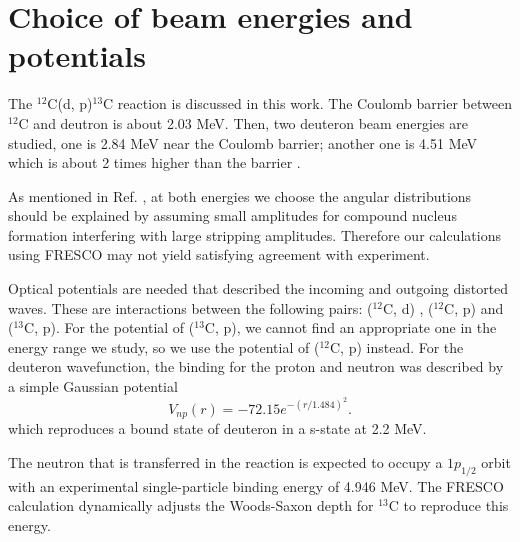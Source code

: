 \section{Choice of beam energies and potentials} \label{part1}
	The $^{12}$C(d, p)$^{13}$C reaction is discussed in this work. 
	The Coulomb barrier between $^{12}$C and deutron is about 2.03 MeV.
	Then, two deuteron beam energies are studied, one is 2.84 MeV near the Coulomb barrier; another one is 4.51 MeV which is about 2 times higher than the barrier .
	
	As mentioned in Ref. \cite{PhysRev.101.209}, at both energies we choose the angular distributions should be explained by assuming small amplitudes for compound nucleus formation interfering with large stripping amplitudes. 
	Therefore our calculations using FRESCO may not yield satisfying agreement with experiment.
	
	Optical potentials are needed that described the incoming and outgoing distorted waves.  
	These are interactions between the following pairs: ($^{12}$C, d) \cite{PhysRevC.73.054605}, ($^{12}$C, p\cite{PTCOG}) and ($^{13}$C, p). 
	For the potential of ($^{13}$C, p), we cannot find an appropriate one in the energy range we study, 
	so we use the potential of ($^{12}$C, p) instead. 
	For the deuteron wavefunction, the binding for the proton and neutron was described by a simple Gaussian potential 
	\begin{equation}
		V_{np}(r)=-72.15e^{-(r/1.484)^2}.
	\end{equation}
	which reproduces a bound state of deuteron in a s-state at 2.2 MeV.
	
	The neutron that is transferred in the reaction is expected to occupy a $1p_{1/2}$ orbit with an experimental single-particle binding energy of 4.946 MeV. 
	The FRESCO calculation dynamically adjusts the Woods-Saxon depth for $^{13}$C to reproduce this energy.
	
	